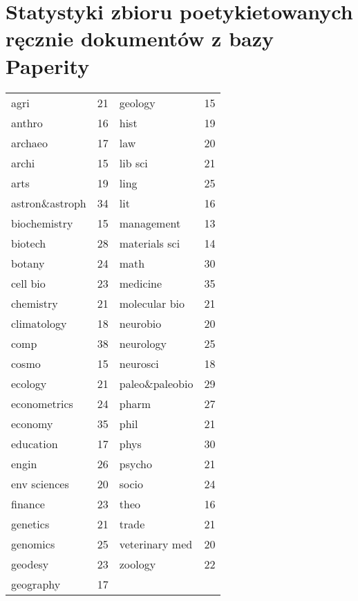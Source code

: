 \documentclass{pracamgr}
\begin{document}
\chapter{Statystyki zbioru poetykietowanych ręcznie dokumentów z bazy Paperity}
\label{paperity-train-initial}

\begin{table}[H]
\centering
\label{my-label}
\begin{tabular}{@{}llll@{}}
\toprule
agri            & 21 & geology         & 15 \\
anthro          & 16 & hist            & 19 \\
archaeo         & 17 & law             & 20 \\
archi           & 15 & lib sci         & 21 \\
arts            & 19 & ling            & 25 \\
astron\&astroph & 34 & lit             & 16 \\
biochemistry    & 15 & management      & 13 \\
biotech         & 28 & materials sci   & 14 \\
botany          & 24 & math            & 30 \\
cell bio        & 23 & medicine        & 35 \\
chemistry       & 21 & molecular bio   & 21 \\
climatology     & 18 & neurobio        & 20 \\
comp            & 38 & neurology       & 25 \\
cosmo           & 15 & neurosci        & 18 \\
ecology         & 21 & paleo\&paleobio & 29 \\
econometrics    & 24 & pharm           & 27 \\
economy         & 35 & phil            & 21 \\
education       & 17 & phys            & 30 \\
engin           & 26 & psycho          & 21 \\
env sciences    & 20 & socio           & 24 \\
finance         & 23 & theo            & 16 \\
genetics        & 21 & trade           & 21 \\
genomics        & 25 & veterinary med  & 20 \\
geodesy         & 23 & zoology         & 22 \\
geography       & 17 &                 &    \\ \bottomrule
\end{tabular}
\end{table}
\end{document}
